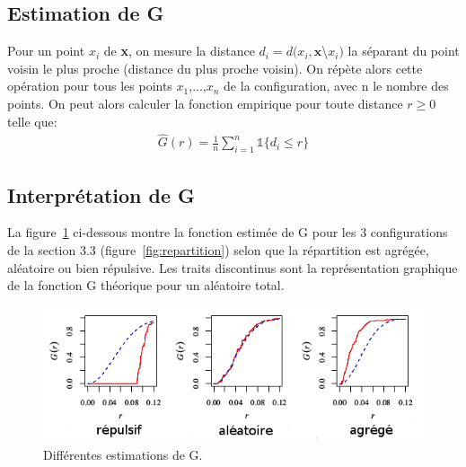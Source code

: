 \documentclass[stage2a]{tnreport}
\begin{document}

\subsection{Estimation de G}

Pour un point \begin{math}x_i\end{math} de \textbf{x}, on mesure la distance \begin{math}d_i = d(x_i,\textbf{x}\end{math}\textbackslash\begin{math} x_i)\end{math} la séparant du point voisin le plus proche (distance du plus proche voisin). On répète alors cette opération pour tous les points \begin{math}x_1\end{math},...,\begin{math}x_n\end{math} de la configuration, avec n le nombre des points. On peut alors calculer la fonction empirique pour toute distance \begin{math} r \geq 0 \end{math} telle que:
\begin{align*} \hat{G}(r) = \frac{1}{n}\sum_{i=1}^n \mathds{1} \{d_i \leq r \}\end{align*}


\subsection{Interprétation de G }

La figure~\ref{fig:interpretG} ci-dessous montre la fonction estimée de G pour les 3 configurations de la section 3.3 (figure~\ref{fig:repartition}) selon que la répartition est agrégée, aléatoire ou bien répulsive. Les traits discontinus sont la représentation graphique de la fonction G théorique pour un aléatoire total.

\begin{figure}[h]
  \centering
  \includegraphics[scale=0.7]{figures/interpretG2.png}
  \caption{Différentes estimations de G.}
  \label{fig:interpretG}
\end{figure}
\end{document}
